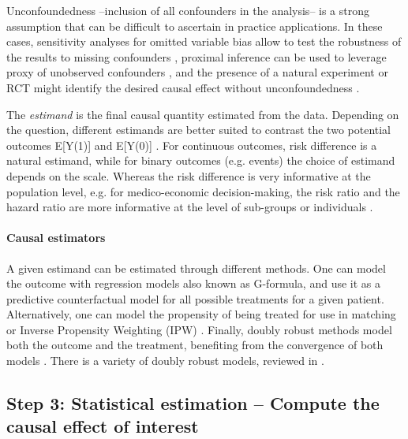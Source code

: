\documentclass[10pt,letterpaper]{article}
\begin{document}
Unconfoundedness --inclusion of all confounders in the analysis-- is a strong
assumption that can be difficult to ascertain in practice applications. In these cases,
sensitivity analyses for omitted variable bias allow to test the robustness of
the results to missing confounders \cite{cinelli2020making}, proximal inference
can be used to leverage proxy of unobserved confounders
\cite{tchetgen2024introduction}, and the presence of a natural experiment or RCT might
identify the desired causal effect without unconfoundedness \cite[Chapter 5,
  9]{wager2020stats}.

The
\emph{estimand} is the final causal quantity estimated from the data.
Depending on the question, different estimands are better suited to contrast
the two potential outcomes E[Y(1)] and E[Y(0)] \cite{imbens_nonparametric_2004,colnet2023risk}. For continuous outcomes, risk
difference is a natural estimand, while for binary outcomes (e.g. events) the
choice of estimand depends on the scale. Whereas the risk difference is very
informative at the population level, e.g. for medico-economic decision-making,
the risk ratio and the hazard ratio are more informative at the level of
sub-groups or individuals \cite{colnet2023risk}.

\paragraph{Causal estimators}

A given estimand can be estimated through different methods. One can model the
outcome with regression models also known as
G-formula, \cite{robins1986role} and use it as a predictive counterfactual model
for all possible treatments for a given patient. Alternatively, one can model
the propensity of being treated for use in matching or Inverse Propensity
Weighting (IPW) \cite{austin2015moving}. Finally, doubly robust methods model
both the outcome and the treatment, benefiting from the convergence of both
models \cite{wager2020stats}. There is a variety of doubly robust models,
reviewed in .

\subsection*{Step 3: Statistical estimation -- Compute the causal effect of interest}\label{sec:estimation}

%
\end{document}
